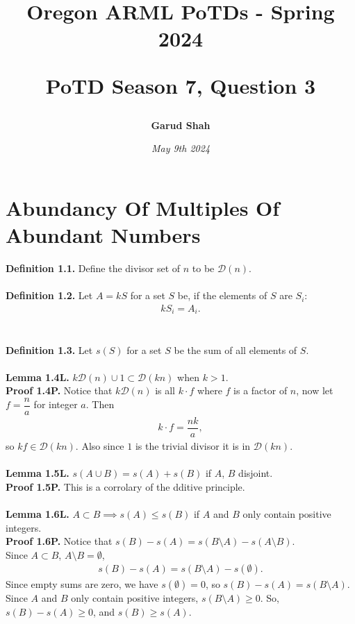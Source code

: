 \documentclass{article}
\title{\begin{center}
    Oregon ARML PoTDs - Spring 2024
\end{center}
\begin{center}
    \textbf{PoTD Season 7, Question 3}
\end{center}}
\author{\textbf{Garud Shah}}
\date{\textit{May 9th 2024}}
\begin{document}
\maketitle
\newpage
\section{Abundancy Of Multiples Of Abundant Numbers}
\textbf{Definition 1.1. }Define the divisor set of $n$ to be $\mathcal{D}(n)$. \\~\\
\textbf{Definition 1.2. }Let $A = kS$ for a set $S$ be, if the elements of $S$ are $S_i$:
\begin{align*}
kS_i = A_i.
\end{align*} \\~\\
\textbf{Definition 1.3. }Let $s(S)$ for a set $S$ be the sum of all elements of $S$. \\~\\
\textbf{Lemma 1.4L. }$k\mathcal{D}(n) \cup 1 \subset \mathcal{D}(kn)$ when $k > 1$. \\
\textbf{Proof 1.4P. }Notice that $k\mathcal{D}(n)$ is all $k \cdot f$ where $f$ is a factor of $n$, now let $f = \dfrac{n}{a}$ for integer $a$.
Then 
\begin{align*}
    k \cdot f = \dfrac{nk}{a}, 
\end{align*}
so $kf \in \mathcal{D}(kn).$ Also since $1$ is the trivial divisor it is in $\mathcal{D}(kn)$. \\~\\
\textbf{Lemma 1.5L. }$s(A \cup B) = s(A) + s(B)$ if $A$, $B$ disjoint. \\
\textbf{Proof 1.5P. }This is a corrolary of the dditive principle.  \\~\\
\textbf{Lemma 1.6L. }$A \subset B \implies s(A) \le s(B)$ if $A$ and $B$ only contain positive integers. \\
\textbf{Proof 1.6P. }Notice that $s(B) - s(A) = s(B \setminus A) - s(A \setminus B)$. \\
Since $A \subset B$, $A \setminus B = \emptyset$, 
\begin{align*}
    s(B) - s(A) = s(B \setminus A) - s(\emptyset).
\end{align*} 
Since empty sums are zero, we have $s(\emptyset) = 0$,
so $s(B) - s(A) = s(B \setminus A)$. Since $A$ and $B$ only contain positive integers, $s(B \setminus A) \ge 0$. So, $s(B) - s(A) \ge 0$, and
$s(B) \ge s(A)$. \\~\\
\end{document}
